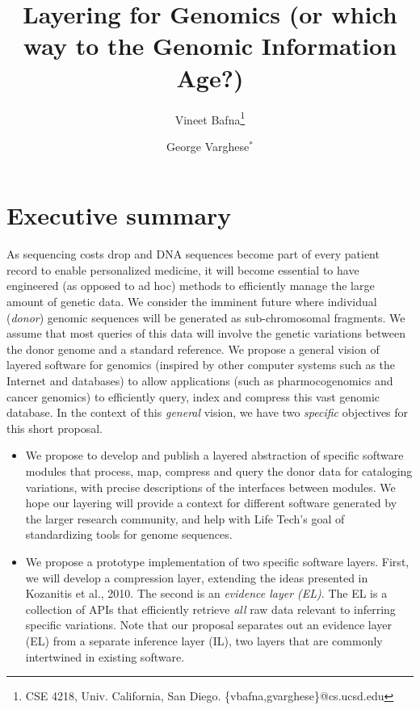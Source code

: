 \documentclass[11pt]{article}
\begin{document}
\title{\vspace{-1in} Layering for Genomics (or which way to the Genomic Information Age?)}
\author{Vineet Bafna\thanks{CSE 4218, Univ. California, San Diego. \{vbafna,gvarghese\}@cs.ucsd.edu} \and George Varghese$^*$}
\date{}
\maketitle
\section{Executive summary}
As sequencing costs drop and DNA sequences become part of every
patient record to enable personalized medicine, it will become
essential to have engineered (as opposed to ad hoc) methods to
efficiently manage the large amount of genetic data.  We consider the
imminent future where individual (\emph{donor}) genomic sequences will
be generated as sub-chromosomal fragments. We assume that most queries
of this data will involve the genetic variations between the donor
genome and a standard reference.  We propose a general vision of
layered software for genomics (inspired by other computer systems such
as the Internet and databases) to allow applications (such as
pharmocogenomics and cancer genomics) to efficiently query, index and
compress this vast genomic database.  In the context of this {\em
  general} vision, we have two {\em specific} objectives for this
short proposal.

\begin{itemize}
\item We propose to develop and publish a layered abstraction of
  specific software modules that process, map, compress and query the donor
  data for cataloging variations, with precise descriptions of the
  interfaces between modules.  We hope our layering will provide a context for
  different software generated by the larger
  research community, and help with Life Tech's goal of standardizing
  tools for genome sequences.
\item We propose a prototype implementation of two specific software
  layers. First, we will develop a compression layer, extending the
  ideas presented in Kozanitis et al., 2010. The second is an
  \emph{evidence layer (EL)}. The EL is a collection of APIs that
  efficiently retrieve \emph{all} raw data relevant to inferring
  specific variations.  Note that our proposal separates out an
  evidence layer (EL) from a separate inference layer (IL), two layers
  that are commonly intertwined in existing software.
  
\end{itemize}
\end{document}
